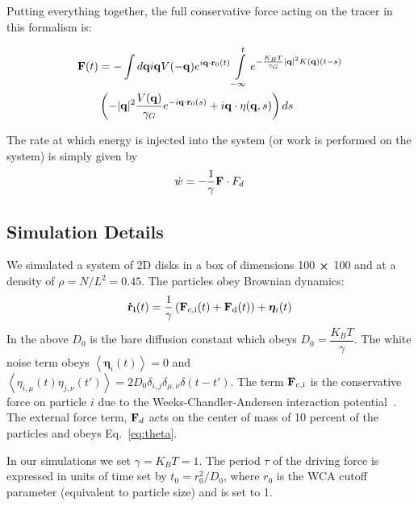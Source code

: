 \documentclass[pre,amsmath,preprintnumbers,10pt,article,notitlepage,twocolumn]{revtex4-1}
\begin{document}
Putting everything together, the full conservative force acting on the tracer in this formalism is:

\begin{equation}
\begin{split}
{\bf F}(t) &= -\int d{\bf q} i{\bf q} V(-{\bf q}) e^{i{\bf q} \cdot {\bf r}_0(t)} \int\limits_{-\infty}^t e^{-\frac{K_BT}{\gamma_G} |{\bf q}|^2 K({\bf q})(t-s)} \\ & \left( - |{\bf q}|^2 \dfrac{ V({\bf q})}{\gamma_G} e^{-i{\bf q} \cdot {\bf r}_0(s)} +  i{\bf q} \cdot \eta({\bf q}, s)\right)ds
\end{split}
\label{eq:ConservativeForce}
\end{equation}

The rate at which energy is injected into the system (or work is performed on the system) is simply given by 
\begin{equation}
\dot{w} = -\frac{1}{\gamma} {\bf F}\cdot {F}_d
\label{eq:wdef}
\end{equation}

\subsection{Simulation Details}

We simulated a system of 2D disks in a box of dimensions 100 $\cross$ 100 and at a density of $\rho=N/L^2=0.45$. The particles obey Brownian dynamics:  
\begin{equation}
{\bf{\dot r}_i}(t) = \dfrac{1}{\gamma} \left({\bf F}_{\rm c,i}(t) + {\bf F}_{\rm d}(t)\right)+\boldsymbol\eta_i (t)
\label{eq:xEOM}
\end{equation}
In the above $D_0$ is the bare diffusion constant which obeys $D_0 = \dfrac{K_B T}{\gamma}$. The white noise term obeys $\left<\boldsymbol\eta_i (t)\right>=0$ and $\left<\eta_{i,\mu}(t)\eta_{j,\nu}(t')\right> = 2D_0\delta_{i,j}\delta_{\mu,\nu}\delta(t-t')$. The term ${\bf F}_{\rm c,i}$ is the conservative force on particle $i$ due to the Weeks-Chandler-Andersen interaction potential~\cite{WCA1971}. The external force term, ${\bf F}_d$ acts on the center of mass of 10 percent of the particles and obeys Eq.~\ref{eq:theta}. 

In our simulations we set $\gamma = K_B T = 1$. The period $\tau$ of the driving force is expressed in units of time set by $t_0=r_0^2/D_0$, where $r_0$ is the WCA cutoff parameter (equivalent to particle size) and is set to 1. 
\end{document}
